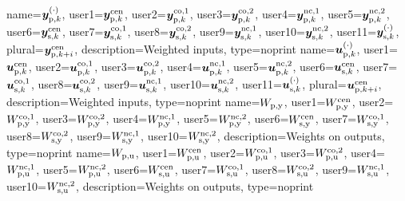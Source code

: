 {
   name={\ensuremath{\vc{y}_{\text{p},k}^{(\cdot)}}},
  user1={\ensuremath{\vc{y}_{\text{p},k}^\text{cen}}},
  user2={\ensuremath{\vc{y}_{\text{p},k}^\text{co,1}}},
  user3={\ensuremath{\vc{y}_{\text{p},k}^\text{co,2}}},
  user4={\ensuremath{\vc{y}_{\text{p},k}^\text{nc,1}}},
  user5={\ensuremath{\vc{y}_{\text{p},k}^\text{nc,2}}},
  user6={\ensuremath{\vc{y}_{\text{s},k}^\text{cen}}},
  user7={\ensuremath{\vc{y}_{\text{s},k}^\text{co,1}}},
  user8={\ensuremath{\vc{y}_{\text{s},k}^\text{co,2}}},
  user9={\ensuremath{\vc{y}_{\text{s},k}^\text{nc,1}}},
 user10={\ensuremath{\vc{y}_{\text{s},k}^\text{nc,2}}},
 user11={\ensuremath{\vc{y}_{\text{s},k}^{(\cdot)}}},
 plural={\ensuremath{\vc{y}_{\text{p},k+i}^\text{cen}}},
  description={Weighted inputs},
  type={noprint}
}
{
   name={\ensuremath{\vc{u}_{\text{p},k}^{(\cdot)}}},
  user1={\ensuremath{\vc{u}_{\text{p},k}^\text{cen}}},
  user2={\ensuremath{\vc{u}_{\text{p},k}^\text{co,1}}},
  user3={\ensuremath{\vc{u}_{\text{p},k}^\text{co,2}}},
  user4={\ensuremath{\vc{u}_{\text{p},k}^\text{nc,1}}},
  user5={\ensuremath{\vc{u}_{\text{p},k}^\text{nc,2}}},
  user6={\ensuremath{\vc{u}_{\text{s},k}^\text{cen}}},
  user7={\ensuremath{\vc{u}_{\text{s},k}^\text{co,1}}},
  user8={\ensuremath{\vc{u}_{\text{s},k}^\text{co,2}}},
  user9={\ensuremath{\vc{u}_{\text{s},k}^\text{nc,1}}},
 user10={\ensuremath{\vc{u}_{\text{s},k}^\text{nc,2}}},
 user11={\ensuremath{\vc{u}_{\text{s},k}^{(\cdot)}}},
 plural={\ensuremath{\vc{u}_{\text{p},k+i}^\text{cen}}},
  description={Weighted inputs},
  type={noprint}
}
{
   name={\ensuremath{W\ut{p,y}}},
  user1={\ensuremath{W\ut{p,y}^\text{cen}}},
  user2={\ensuremath{W\ut{p,y}^\text{co,1}}},
  user3={\ensuremath{W\ut{p,y}^\text{co,2}}},
  user4={\ensuremath{W\ut{p,y}^\text{nc,1}}},
  user5={\ensuremath{W\ut{p,y}^\text{nc,2}}},
  user6={\ensuremath{W\ut{s,y}^\text{cen}}},
  user7={\ensuremath{W\ut{s,y}^\text{co,1}}},
  user8={\ensuremath{W\ut{s,y}^\text{co,2}}},
  user9={\ensuremath{W\ut{s,y}^\text{nc,1}}},
 user10={\ensuremath{W\ut{s,y}^\text{nc,2}}},
  description={Weights on outputs},
  type={noprint}
}
{
   name={\ensuremath{W\ut{p,u}}},
  user1={\ensuremath{W\ut{p,u}^\text{cen}}},
  user2={\ensuremath{W\ut{p,u}^\text{co,1}}},
  user3={\ensuremath{W\ut{p,u}^\text{co,2}}},
  user4={\ensuremath{W\ut{p,u}^\text{nc,1}}},
  user5={\ensuremath{W\ut{p,u}^\text{nc,2}}},
  user6={\ensuremath{W\ut{s,u}^\text{cen}}},
  user7={\ensuremath{W\ut{s,u}^\text{co,1}}},
  user8={\ensuremath{W\ut{s,u}^\text{co,2}}},
  user9={\ensuremath{W\ut{s,u}^\text{nc,1}}},
 user10={\ensuremath{W\ut{s,u}^\text{nc,2}}},
  description={Weights on outputs},
  type={noprint}
}

